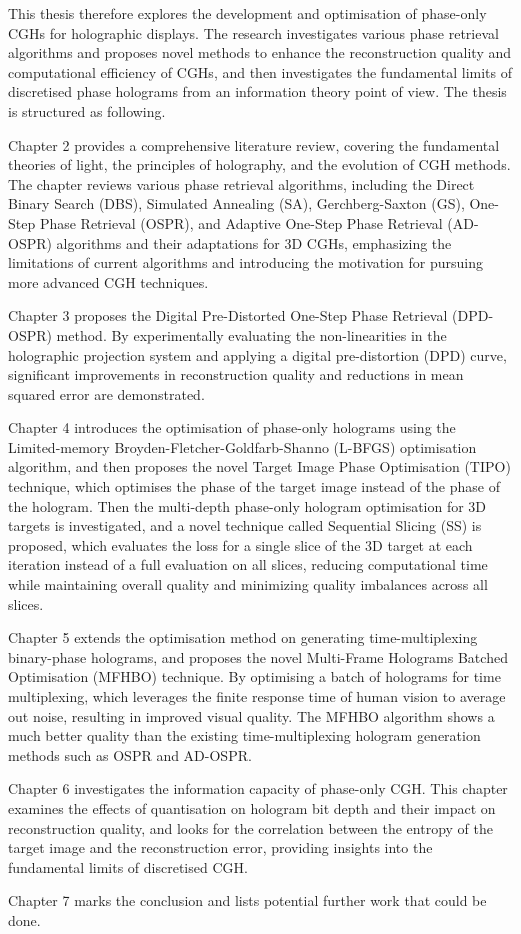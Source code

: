 This thesis therefore explores the development and optimisation of phase-only CGHs for holographic displays. The research investigates various phase retrieval algorithms and proposes novel methods to enhance the reconstruction quality and computational efficiency of CGHs, and then investigates the fundamental limits of discretised phase holograms from an information theory point of view. The thesis is structured as following.

Chapter 2 provides a comprehensive literature review, covering the fundamental theories of light, the principles of holography, and the evolution of CGH methods. The chapter reviews various phase retrieval algorithms, including the Direct Binary Search (DBS), Simulated Annealing (SA), Gerchberg-Saxton (GS), One-Step Phase Retrieval (OSPR), and Adaptive One-Step Phase Retrieval (AD-OSPR) algorithms and their adaptations for 3D CGHs, emphasizing the limitations of current algorithms and introducing the motivation for pursuing more advanced CGH techniques.

Chapter 3 proposes the Digital Pre-Distorted One-Step Phase Retrieval (DPD-OSPR) method. By experimentally evaluating the non-linearities in the holographic projection system and applying a digital pre-distortion (DPD) curve, significant improvements in reconstruction quality and reductions in mean squared error are demonstrated.

Chapter 4 introduces the optimisation of phase-only holograms using the Limited-memory Broyden-Fletcher-Goldfarb-Shanno (L-BFGS) optimisation algorithm, and then proposes the novel Target Image Phase Optimisation (TIPO) technique, which optimises the phase of the target image instead of the phase of the hologram. Then the multi-depth phase-only hologram optimisation for 3D targets is investigated, and a novel technique called Sequential Slicing (SS) is proposed, which evaluates the loss for a single slice of the 3D target at each iteration instead of a full evaluation on all slices, reducing computational time while maintaining overall quality and minimizing quality imbalances across all slices.

Chapter 5 extends the optimisation method on generating time-multiplexing binary-phase holograms, and proposes the novel Multi-Frame Holograms Batched Optimisation (MFHBO) technique. By optimising a batch of holograms for time multiplexing, which leverages the finite response time of human vision to average out noise, resulting in improved visual quality. The MFHBO algorithm shows a much better quality than the existing time-multiplexing hologram generation methods such as OSPR and AD-OSPR.

Chapter 6 investigates the information capacity of phase-only CGH. This chapter examines the effects of quantisation on hologram bit depth and their impact on reconstruction quality, and looks for the correlation between the entropy of the target image and the reconstruction error, providing insights into the fundamental limits of discretised CGH.

Chapter 7 marks the conclusion and lists potential further work that could be done.
